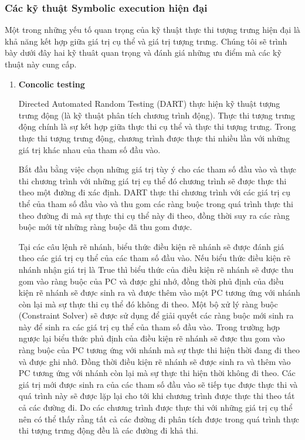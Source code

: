 \documentclass[12pt,a4paper]{article}
\begin{document}
\subsubsection{Các kỹ thuật Symbolic execution hiện đại}

Một trong những yếu tố quan trọng của kỹ thuật thực thi tượng trưng hiện đại là khả năng kết hợp giữa giá trị cụ thể và giá trị tượng trưng. Chúng tôi sẽ trình bày dưới đây hai kỹ thuât quan trọng và đánh giá những ưu điểm mà các kỹ thuật này cung cấp.

\begin{enumerate}
\item \textbf{Concolic testing}

Directed Automated Random Testing (DART) \cite{ganesh2007decision} thực hiện kỹ thuật tượng trưng động (là kỹ thuật phân tích chương trình động). Thực thi tượng trưng động chính là sự kết hợp giữa thực thi cụ thể và thực thi tượng trưng. Trong thực thi tượng trưng động, chương trình được thực thi nhiều lần với những giá trị khác nhau của tham số đầu vào.

Bắt đầu bằng việc chọn những giá trị tùy ý cho các tham số đầu vào và thực thi chương trình với những giá trị cụ thể đó chương trình sẽ được thực thi theo một đường đi xác định. DART thực thi chương trình với các giá trị cụ thể của tham số đầu vào và thu gom các ràng buộc trong quá trình thực thi theo đường đi mà sự thực thi cụ thể này đi theo, đồng thời suy ra các ràng buộc mới từ những ràng buộc đã thu gom được.

Tại các câu lệnh rẽ nhánh, biểu thức điều kiện rẽ nhánh sẽ được đánh giá theo các giá trị cụ thể của các tham số đầu vào. Nếu biểu thức điều kiện rẽ nhánh nhận giá trị là True thì biểu thức của điều kiện rẽ nhánh sẽ được thu gom vào ràng buộc của PC và được ghi nhớ, đồng thời phủ định của điều kiện rẽ nhánh sẽ được sinh ra và được thêm vào một PC tương ứng với nhánh còn lại mà sự thực thi cụ thể đó không đi theo. Một bộ xử lý ràng buộc (Constraint Solver) sẽ được sử dụng để giải quyết các ràng buộc mới sinh ra này để sinh ra các giá trị cụ thể của tham số đầu vào. Trong trường hợp ngược lại biểu thức phủ định của điều kiện rẽ nhánh sẽ được thu gom vào ràng buộc của PC tương ứng với nhánh mà sự thực thi hiện thời đang đi theo và được ghi nhớ. Đồng thời điều kiện rẽ nhánh sẽ được sinh ra và thêm vào PC tương ứng với nhánh còn lại mà sự thực thi hiện thời không đi theo. Các giá trị mới được sinh ra của các tham số đầu vào sẽ tiếp tục được thực thi và quá trình này sẽ được lặp lại cho tới khi chương trình được thực thi theo tất cả các đường đi. Do các chương trình được thực thi với những giá trị cụ thể nên có thể thấy rằng tất cả các đường đi phân tích được trong quá trình thực thi tượng trưng động đều là các đường đi khả thi.


\end{enumerate}
\end{document}
